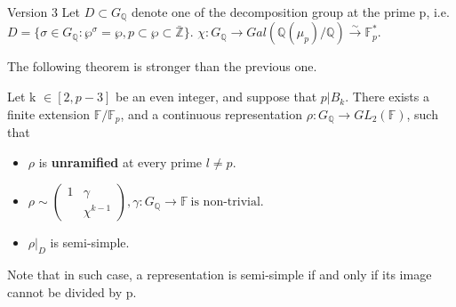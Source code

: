 \documentclass{beamer}
\theoremstyle{plain}
\theoremstyle{definition}
\theoremstyle{remark}
\newcommand{\Q}{\mathbb{Q}}
\newcommand{\Z}{\mathbb{Z}}
\newcommand{\F}{\mathbb{F}}
\begin{document}
\begin{frame}{Version 3}
    Let $D  \subset G_{\Q}$ denote one of the decomposition group at the prime p, i.e.
    $D=\{\sigma \in G_{\Q}: \wp^{\sigma}=\wp, p \subset \wp \subset \bar{\Z} \}$. $\chi: G_{\Q} \to Gal(\Q({\mu_p})/\Q) \stackrel{\sim}{\longrightarrow} \mathbb{F}_p^*$.

    The following theorem is stronger than the previous one.
    \begin{theorem}
        Let k $\in [2,p-3] $ be an even integer, and suppose that $p|B_k$. There exists
        a finite extension $\F/\F_p$, and a continuous representation $\rho : G_{\Q} \to GL_2(\F)$, such that
        \begin{itemize}
            \item $\rho $ is \textbf{unramified} at every prime $l \ne p$.
            \item $ \rho \sim \begin{pmatrix}
                          1 & \gamma     \\
                            & \chi^{k-1}
                      \end{pmatrix}, \gamma: G_{\Q} \to \F \ \text{is non-trivial.} $
            \item $\rho |_{D}$ is semi-simple.
        \end{itemize}
    \end{theorem}
    Note that in such case, a representation is semi-simple if and only if its image cannot be divided by p.
\end{frame}
\end{document}
